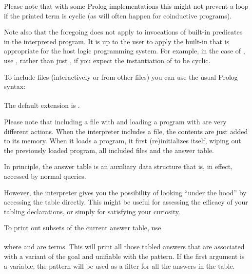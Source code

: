 Please note that with some Prolog implementations this might not prevent a
loop if the printed term is cyclic (as will often happen for coinductive
programs).

Note also that the foregoing does not apply to invocations of built-in
predicates in the interpreted program.  It is up to the user to apply the
built-in that is appropriate for the host logic programming system.  For
example, in the case of \Sicstus{}, use
, rather than just , if you expect the instantiation of  to be cyclic.




To include files (interactively or from other files) you can use the usual
Prolog syntax:\\
\ind
{}%
\label{dir:include}\\
The default extension is .%
%

Please note that including a file with   and
loading a program with  are very different
actions. When the interpreter includes a file, the contents are just
added to its memory. When it loads a program, it first (re)initializes
itself, wiping out the previously loaded program, all included files and the
answer table.



%

In principle, the answer table is an auxiliary data structure that is, in
effect, accessed by normal queries.

However, the interpreter gives you the possibility of looking ``under the
hood'' by accessing the table directly.  This might be useful for assessing
the efficacy of your tabling declarations, or simply for satisfying your
curiosity.

To print out subsets of the current answer table, use\\
\ind{}%
\label{dir:answers}\\
where  and  are terms.
This will print all those tabled answers that are associated with a variant
of the goal and unifiable with the pattern.  If the first argument is a
variable, the pattern will be used as a filter for all the answers in the
table.


